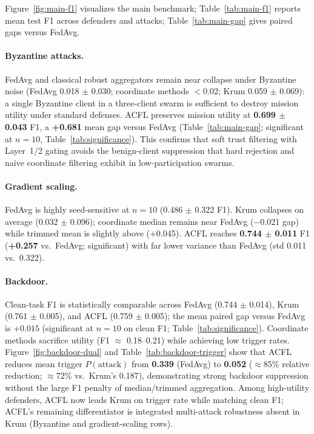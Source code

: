 Figure~\ref{fig:main-f1} visualizes the main benchmark; Table~\ref{tab:main-f1} reports mean test F1 across defenders and attacks; Table~\ref{tab:main-gap} gives paired gaps versus FedAvg.

\paragraph{Byzantine attacks.}
FedAvg and classical robust aggregators remain near collapse under Byzantine noise (FedAvg 0.018 $\pm$ 0.030; coordinate methods $<0.02$; Krum 0.059 $\pm$ 0.069): a single Byzantine client in a three-client swarm is sufficient to destroy mission utility under standard defenses.
ACFL preserves mission utility at \textbf{0.699 $\pm$ 0.043} F1, a \textbf{+0.681} mean gap versus FedAvg (Table~\ref{tab:main-gap}; significant at $n{=}10$, Table~\ref{tab:significance}).
This confirms that soft trust filtering with Layer~1/2 gating avoids the benign-client suppression that hard rejection and naive coordinate filtering exhibit in low-participation swarms.

\paragraph{Gradient scaling.}
FedAvg is highly seed-sensitive at $n{=}10$ (0.486 $\pm$ 0.322 F1).
Krum collapses on average (0.032 $\pm$ 0.096); coordinate median remains near FedAvg ($-$0.021 gap) while trimmed mean is slightly above ($+$0.045).
ACFL reaches \textbf{0.744 $\pm$ 0.011} F1 (\textbf{+0.257} vs.\ FedAvg; significant) with far lower variance than FedAvg (std 0.011 vs.\ 0.322).

\paragraph{Backdoor.}
Clean-task F1 is statistically comparable across FedAvg (0.744 $\pm$ 0.014), Krum (0.761 $\pm$ 0.005), and ACFL (0.759 $\pm$ 0.005); the mean paired gap versus FedAvg is $+0.015$ (significant at $n{=}10$ on clean F1; Table~\ref{tab:significance}).
Coordinate methods sacrifice utility (F1 $\approx$ 0.18--0.21) while achieving low trigger rates.
Figure~\ref{fig:backdoor-dual} and Table~\ref{tab:backdoor-trigger} show that ACFL reduces mean trigger $P(\text{attack})$ from \textbf{0.339} (FedAvg) to \textbf{0.052} ($\approx$85\% relative reduction; $\approx$72\% vs.\ Krum's 0.187), demonstrating strong backdoor suppression without the large F1 penalty of median/trimmed aggregation.
Among high-utility defenders, ACFL now leads Krum on trigger rate while matching clean F1; ACFL's remaining differentiator is integrated multi-attack robustness absent in Krum (Byzantine and gradient-scaling rows).

